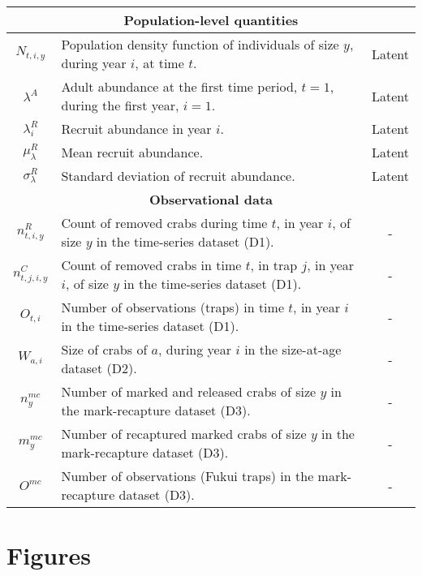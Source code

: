 \documentclass{article}
\begin{document}
\begin{longtable}{||c p{9cm} c||}
 \hline\hline
 \multicolumn{3}{||c||}{\textbf{Population-level quantities}} \\ 
 \hline
 $N_{t,i,y}$ & Population density function of individuals of size $y$, during year $i$, at time $t$. & Latent \\ 
 \hline
 $\lambda^A$ & Adult abundance at the first time period, $t=1$, during the first year, $i=1$. & Latent \\
 \hline
 $\lambda^R_i$ & Recruit abundance in year $i$. & Latent \\
 \hline
 $\mu^R_{\lambda}$ & Mean recruit abundance. & Latent \\
 \hline
 $\sigma^R_{\lambda}$ & Standard deviation of recruit abundance. & Latent \\
 \hline\hline
 \multicolumn{3}{||c||}{\textbf{Observational data}} \\ 
 \hline
 $n^R_{t,i,y}$ & Count of removed crabs during time $t$, in year $i$, of size $y$ in the time-series dataset (D1). & - \\ 
 \hline
 $n^C_{t,j,i,y}$ & Count of removed crabs in time $t$, in trap $j$, in year $i$, of size $y$ in the time-series dataset (D1). & - \\
 \hline
 $O_{t,i}$ & Number of observations (traps) in time $t$, in year $i$ in the time-series dataset (D1). & - \\
 \hline
 $W_{a,i}$ & Size of crabs of $a$, during year $i$ in the size-at-age dataset (D2). & - \\
 \hline
 $n^{mc}_{y}$ & Number of marked and released crabs of size $y$ in the mark-recapture dataset (D3). & - \\
 \hline
 $m^{mc}_{y}$ & Number of recaptured marked crabs of size $y$ in the mark-recapture dataset (D3). & - \\
 \hline
 $O^{mc}$ & Number of observations (Fukui traps) in the mark-recapture dataset (D3). & - \\
 \hline
\end{longtable}

\section{Figures}
\end{document}
